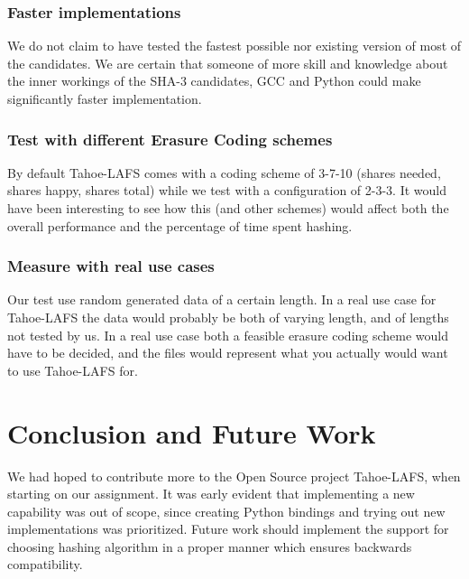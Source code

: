 \documentclass[english,12pt,a4paper]{book}
\begin{document}
\subsection{Faster implementations}
We do not claim to have tested the fastest possible nor existing version
of most of the candidates. We are certain that someone of more skill and
knowledge about the inner workings of the \ac{SHA}-3 candidates, \ac{GCC} and
Python could make significantly faster implementation.

\subsection{Test with different Erasure Coding schemes}
By default Tahoe-\ac{LAFS} comes with a coding scheme of 3-7-10 (shares needed,
shares happy, shares total) while we test with a configuration of 2-3-3. It
would have been interesting to see how this (and other schemes) would affect
both the overall performance and the percentage of time spent hashing.

\subsection{Measure with real use cases}
Our test use random generated data of a certain length. In a real use case for
Tahoe-\ac{LAFS} the data would probably be both of varying length, and of
lengths not tested by us. In a real use case both a feasible erasure coding
scheme would have to be decided, and the files would represent what you
actually would want to use Tahoe-\ac{LAFS} for.

\chapter{Conclusion and Future Work}


We had hoped to contribute more to the Open Source project Tahoe-LAFS, when
starting on our assignment. It was early evident that implementing a new
capability was out of scope, since creating Python bindings and trying out
new implementations was prioritized. Future work should implement the support
for choosing hashing algorithm in a proper manner which ensures backwards
compatibility.
\end{document}
